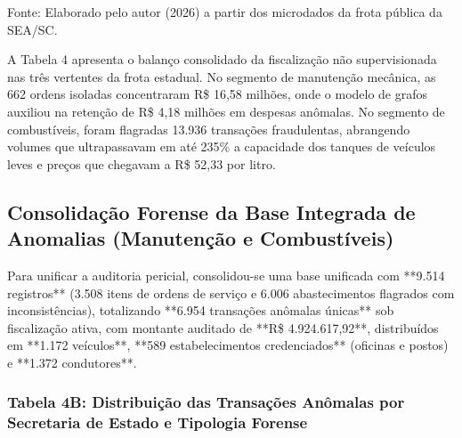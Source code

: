\documentclass[12pt,a4paper]{article}
\begin{document}
Fonte: Elaborado pelo autor (2026) a partir dos microdados da frota pública da SEA/SC.

A Tabela 4 apresenta o balanço consolidado da fiscalização não supervisionada nas três vertentes da frota estadual. No segmento de manutenção mecânica, as 662 ordens isoladas concentraram R\$ 16,58 milhões, onde o modelo de grafos auxiliou na retenção de R\$ 4,18 milhões em despesas anômalas. No segmento de combustíveis, foram flagradas 13.936 transações fraudulentas, abrangendo volumes que ultrapassavam em até 235\% a capacidade dos tanques de veículos leves e preços que chegavam a R\$ 52,33 por litro.


\subsection{Consolidação Forense da Base Integrada de Anomalias (Manutenção e Combustíveis)}

Para unificar a auditoria pericial, consolidou-se uma base unificada com **9.514 registros** (3.508 itens de ordens de serviço e 6.006 abastecimentos flagrados com inconsistências), totalizando **6.954 transações anômalas únicas** sob fiscalização ativa, com montante auditado de **R\$ 4.924.617,92**, distribuídos em **1.172 veículos**, **589 estabelecimentos credenciados** (oficinas e postos) e **1.372 condutores**.


\subsubsection{Tabela 4B: Distribuição das Transações Anômalas por Secretaria de Estado e Tipologia Forense}
\end{document}
